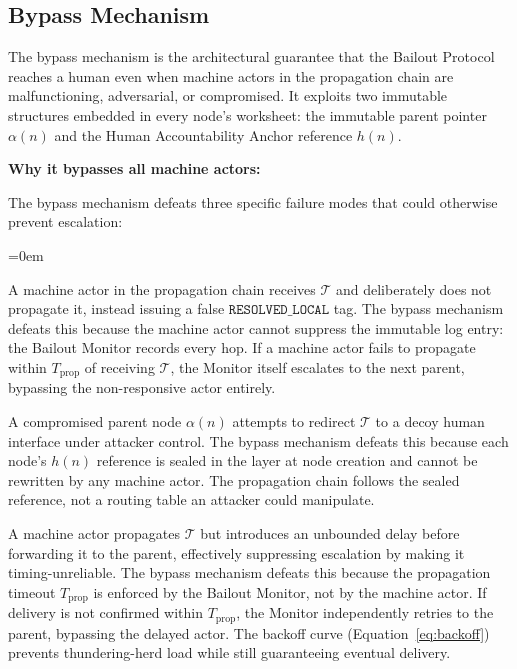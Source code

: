 \subsection{Bypass Mechanism}\label{sec:bailout-bypass}

The bypass mechanism is the architectural guarantee that the Bailout Protocol
reaches a human even when machine actors in the propagation chain are
malfunctioning, adversarial, or compromised. It exploits two immutable
structures embedded in every node's worksheet: the immutable parent pointer
$\alpha(n)$ and the Human Accountability Anchor reference $h(n)$.

\bigskip
\noindent\textbf{Why it bypasses all machine actors:}

The bypass mechanism defeats three specific failure modes that could otherwise
prevent escalation:

\begin{trivlist}\itemindent=0em
\item[\textbf{Intercept:}] A machine actor in the propagation chain receives
  $\mathcal{T}$ and deliberately does not propagate it, instead issuing a
  false $\texttt{RESOLVED\_LOCAL}$ tag. The bypass mechanism defeats this because
  the machine actor cannot suppress the immutable log entry: the Bailout Monitor
  records every hop. If a machine actor fails to propagate within
  $T_{\text{prop}}$ of receiving $\mathcal{T}$, the Monitor itself escalates to
  the next parent, bypassing the non-responsive actor entirely.

\item[\textbf{Redirect:}] A compromised parent node $\alpha(n)$ attempts to
  redirect $\mathcal{T}$ to a decoy human interface under attacker control. The
  bypass mechanism defeats this because each node's $h(n)$ reference is sealed
  in the \fact{} layer at node creation and cannot be rewritten by any machine
  actor. The propagation chain follows the sealed reference, not a routing table
  an attacker could manipulate.

\item[\textbf{Delay:}] A machine actor propagates $\mathcal{T}$ but introduces
  an unbounded delay before forwarding it to the parent, effectively suppressing
  escalation by making it timing-unreliable. The bypass mechanism defeats this
  because the propagation timeout $T_{\text{prop}}$ is enforced by the Bailout
  Monitor, not by the machine actor. If delivery is not confirmed within
  $T_{\text{prop}}$, the Monitor independently retries to the parent, bypassing
  the delayed actor. The backoff curve (Equation~\ref{eq:backoff}) prevents
  thundering-herd load while still guaranteeing eventual delivery.
\end{trivlist}

